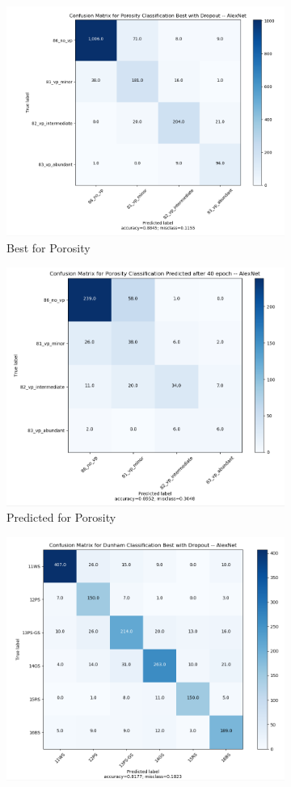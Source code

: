 \begin{figure}
\begin{subfigure}{.5\textwidth}
  \centering
  \includegraphics[width=.8\linewidth]{figures/04-al_baby_best.PNG}
  \caption{Best for Porosity}
  \label{fig:alcm_poro}
\end{subfigure}%
\begin{subfigure}{.5\textwidth}
  \centering
  \includegraphics[width=.8\linewidth]{figures/04-al_baby_pred.PNG}
  \caption{Predicted for Porosity}
  \label{fig:alcmpred_poro}
\end{subfigure}
\begin{subfigure}{.5\textwidth}
  \centering
  \includegraphics[width=.8\linewidth]{figures/04-al_dunham_best.PNG}

\end{subfigure}
\end{figure}
